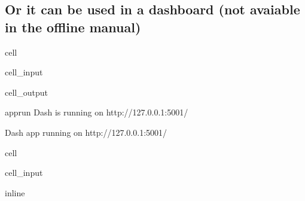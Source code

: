 \documentclass[letterpaper,10pt,english]{jupyterBook}
\begin{document}
\subsection{Or it can be used in a dashboard (not avaiable in the offline manual)}
\label{\detokenize{content/06_ModelAnalytics/Attribution:or-it-can-be-used-in-a-dashboard-not-avaiable-in-the-offline-manual}}
\begin{sphinxuseclass}{cell}\begin{sphinxVerbatimInput}

\begin{sphinxuseclass}{cell_input}
\begin{sphinxVerbatim}[commandchars=\\\{\}]
\end{sphinxVerbatim}

\end{sphinxuseclass}\end{sphinxVerbatimInput}
\begin{sphinxVerbatimOutput}

\begin{sphinxuseclass}{cell_output}
\begin{sphinxVerbatim}[commandchars=\\\{\}]
apprun
Dash is running on http://127.0.0.1:5001/
\end{sphinxVerbatim}

\begin{sphinxVerbatim}[commandchars=\\\{\}]
Dash app running on http://127.0.0.1:5001/
\end{sphinxVerbatim}

\end{sphinxuseclass}\end{sphinxVerbatimOutput}

\end{sphinxuseclass}
\sphinxstepscope

\begin{sphinxuseclass}{cell}\begin{sphinxVerbatimInput}

\begin{sphinxuseclass}{cell_input}
\begin{sphinxVerbatim}[commandchars=\\\{\}]
 inline
\end{sphinxVerbatim}

\end{sphinxuseclass}\end{sphinxVerbatimInput}

\end{sphinxuseclass}
\end{document}
